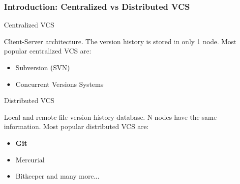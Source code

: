 \begin{frame}

\frametitle{Introduction: Centralized vs Distributed VCS}
\begin{block}{Centralized VCS}

Client-Server architecture. The version history is stored in only 1 node. Most popular centralized VCS are:
\begin{itemize}
\item Subversion (SVN)
\item Concurrent Versions Systems
\end{itemize}

\end{block}

\pause

\begin{block}{Distributed VCS}

Local and remote file version history database. N nodes have the same information. Most popular distributed VCS are:
\begin{itemize}
\item \textbf{Git}
\item Mercurial
\item Bitkeeper and many more...
\end{itemize}

\end{block}

\end{frame}